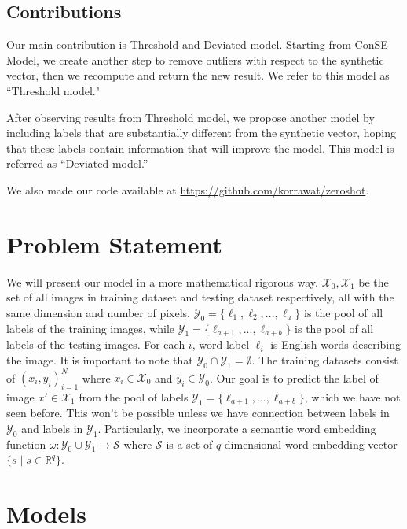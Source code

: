 \documentclass[11pt,letterpaper]{article}
\newcommand\tab[1][1cm]{\hspace*{#1}}
\begin{document}
\subsection{Contributions}
Our main contribution is Threshold and Deviated model. Starting from ConSE Model, we create another step to remove outliers with respect to the synthetic vector, then we recompute and return the new result. We refer to this model as ``Threshold model."

After observing results from Threshold model, we propose another model by including labels that are substantially different from the synthetic vector, hoping that these labels contain information that will improve the model. This model is referred as ``Deviated model.''   

We also made our code available at
\url{https://github.com/korrawat/zeroshot}.

\section{Problem Statement}
\tab We will present our model in a more mathematical rigorous way. $\mathcal{X}_0,\mathcal{X}_1$ be the set of all images in training dataset and testing dataset respectively, all with the same dimension and number of pixels. $\mathcal{Y}_0 = \{ \ell_1,\ell_2,...,\ell_a\}$ is the pool of all labels of the training images, while $\mathcal{Y}_1 = \{\ell_{a+1},...,\ell_{a+b} \}$ is the pool of all labels of the testing images. For each $i$, word label $\ell_i$ is English words describing the image. It is important to note that $\mathcal{Y}_0 \cap \mathcal{Y}_1 = \emptyset$. The training datasets consist of $(x_i,y_i)^{N}_{i=1}$ where $x_i \in \mathcal{X}_0$ and $y_i \in \mathcal{Y}_0$. Our goal is to predict the label of image $x' \in \mathcal{X}_1$ from the pool of labels $\mathcal{Y}_1 = \{\ell_{a+1},...,\ell_{a+b} \}$, which we have not seen before. This won't be possible unless we have connection between labels in $\mathcal{Y}_0$ and labels in $\mathcal{Y}_1$. Particularly, we incorporate a semantic word embedding function $\omega: \mathcal{Y}_0 \cup \mathcal{Y}_1 \rightarrow \mathcal{S}$ where $\mathcal{S}$ is a set of $q$-dimensional word embedding vector  $\{ s \mid s \in  \mathbb{R}^q \}$.

\section{Models}
\end{document}
